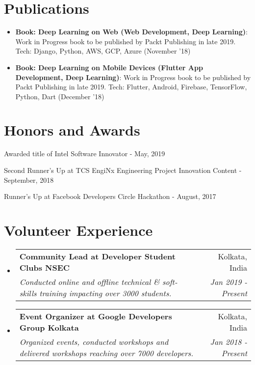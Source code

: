 \documentclass[a4paper,20pt]{article}
\makeatletter
\newcommand{\resumeItem}[2]{
  \item\small{
    \textbf{#1}{: #2 \vspace{-2pt}}
  }
}
\newcommand{\resumeSubheading}[4]{
  \vspace{-1pt}\item
    \begin{tabular*}{0.97\textwidth}{l@{\extracolsep{\fill}}r}
      \textbf{#1} & #2 \\
      \textit{#3} & \textit{#4} \\
    \end{tabular*}\vspace{-5pt}
}
\newcommand{\resumeSubItem}[2]{\resumeItem{#1}{#2}\vspace{-3pt}}
\newcommand{\resumeSubHeadingListStart}{\begin{itemize}[leftmargin=*]}
\newcommand{\resumeSubHeadingListEnd}{\end{itemize}}
\makeatother
\begin{document}
\section{Publications}
\resumeSubHeadingListStart
\resumeSubItem{Book: Deep Learning on Web (Web Development, Deep Learning)}{Work in Progress book to be published by Packt Publishing in late 2019. Tech: Django, Python, AWS, GCP, Azure (November '18)}
\vspace{2pt}
\resumeSubItem{Book: Deep Learning on Mobile Devices (Flutter App Development, Deep Learning)}{Work in Progress book to be published by Packt Publishing in late 2019. Tech: Flutter, Android, Firebase, TensorFlow, Python, Dart (December '18)}
\resumeSubHeadingListEnd
\vspace{-5pt}
\section{Honors and Awards}
\begin{description}[font=$\bullet$]
\item {Awarded title of Intel Software Innovator - May, 2019}
\vspace{-5pt}
\item {Second Runner's Up at TCS EngiNx Engineering Project Innovation Content - September, 2018 }
\vspace{-5pt}
\item {Runner's Up at Facebook Developers Circle Hackathon - August, 2017}

\end{description}

\vspace{-5pt}
\section{Volunteer Experience}
  \resumeSubHeadingListStart
	\resumeSubheading
    {Community Lead at Developer Student Clubs NSEC}{Kolkata, India}
    {Conducted online and offline technical \& soft-skills training impacting over 3000 students.}{Jan 2019 - Present}
\vspace{5pt}
    \resumeSubheading
    {Event Organizer at Google Developers Group Kolkata}{Kolkata, India}
    {Organized events, conducted workshops and delivered workshops reaching over 7000 developers.}{Jan 2018 - Present}

\resumeSubHeadingListEnd
\end{document}

